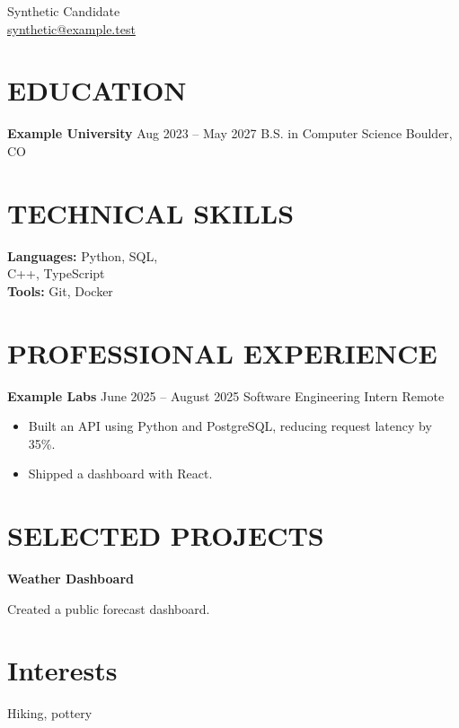 \documentclass{article}
\newcommand{\resumeSubheading}[4]{\textbf{#1} #2 #3 #4}
\newcommand{\resumeItem}[1]{\item #1}
\newcommand{\resumeItemListStart}{\begin{itemize}}
\newcommand{\resumeItemListEnd}{\end{itemize}}
\begin{document}
{\fontsize{20}{24}\selectfont Synthetic Candidate}\\
\href{mailto:synthetic@example.test}{synthetic@example.test}
\section*{EDUCATION}
\resumeSubheading{Example University}{Aug 2023 -- May 2027}
 {B.S. in Computer Science}{Boulder, CO}
\section{TECHNICAL SKILLS}
\textbf{Languages:} Python, SQL,\\
 C++, TypeScript\\
\textbf{Tools:} Git, Docker
\section{PROFESSIONAL EXPERIENCE}
\resumeSubheading{Example Labs}{June 2025 -- August 2025}
 {Software Engineering Intern}{Remote}
\resumeItemListStart
\resumeItem{Built an API using Python and PostgreSQL,
 reducing request latency by 35\%.}
\resumeItem{Shipped a dashboard with React.}
\resumeItemListEnd
\section{SELECTED PROJECTS}
\textbf{Weather Dashboard}\\
\resumeItem{Created a public forecast dashboard.}
\section{Interests}
Hiking, pottery
\end{document}
